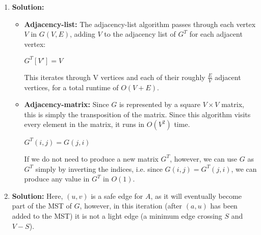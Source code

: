 \documentclass{article}
\begin{document}
\begin{enumerate}
\item \textbf{Solution:} 
\begin{itemize}
    \item \textbf{Adjacency-list:}
    The adjacency-list algorithm passes through each vertex $V$ in $G(V,E)$, adding $V$ to the adjacency list of $G^{T}$ for each adjacent vertex:
    \begin{algorithm}[H]
    \caption{}
    \begin{algorithmic}
    \STATE $G^{T}[V'] = V$ 
    \ENDFOR
    \ENDFOR
    \end{algorithmic} 
    \end{algorithm}
    This iterates through V vertices and each of their roughly $\frac{E}{V}$ adjacent vertices, for a total runtime of $O(V+E)$.

    \item \textbf{Adjacency-matrix:}
    Since $G$ is represented by a square $V\times{V}$ matrix, this is simply the transposition of the matrix. Since this algorithm visits every element in the matrix, it runs in $O(V^{2})$ time. 
    \begin{algorithm}[H]
    \caption{}
    \begin{algorithmic}
    \STATE $G^{T}(i,j) = G(j,i)$ 
    \ENDFOR
    \ENDFOR
    \end{algorithmic} 
    \end{algorithm}
If we do not need to produce a new matrix $G^{T}$, however, we can use $G$ as $G^{T}$ simply by inverting the indices, i.e. since $G(i,j)=G^{T}(j,i)$, we can produce any value in $G^{T}$ in $O(1)$.

\end{itemize}

\item \textbf{Solution:}
Here, $(u,v)$ is a safe edge for $A$, as it will eventually become part of the MST of $G$, however, in this iteration (after $(a,u)$ has been added to the MST) it is not a light edge (a minimum edge crossing $S$ and $V-S$). 
\begin{figure}[!h]
\centering
{}
\end{figure}
\end{enumerate}
\end{document}
